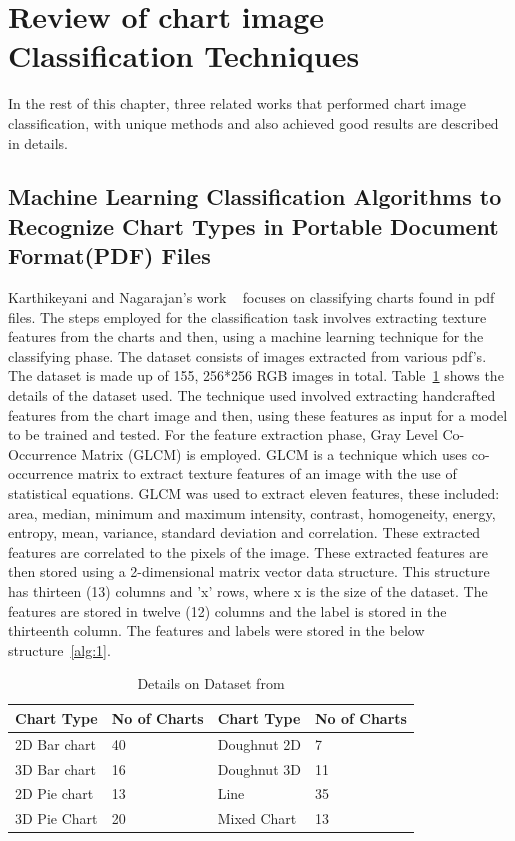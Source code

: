 \documentclass[12pt, a4paper,oneside]{report}
\begin{document}
\section{Review of chart image Classification Techniques}
In the rest of this chapter, three related works that performed chart image classification, with unique methods and also achieved good results are described in details.  

\subsection{Machine Learning Classification Algorithms to Recognize Chart Types in Portable Document Format(PDF) Files}
Karthikeyani and Nagarajan's work ~\cite{karthikeyani2012machine} focuses on classifying charts found in pdf files. The steps employed for the classification task involves extracting texture features from the charts and then, using a machine learning technique for the classifying phase. The dataset consists of images extracted from various pdf's. The dataset is made up of 155, 256*256 RGB images in total. Table~\ref{table:pdf} shows the details of the dataset used.
The technique used involved extracting handcrafted features from the chart image and then, using these features as input for a model to be trained and tested.
For the feature extraction phase, Gray Level Co-Occurrence Matrix (GLCM) is employed. GLCM is a technique which uses co-occurrence matrix to extract texture features of an image with the use of statistical equations. GLCM was used to extract eleven features, these included: area, median, minimum and maximum intensity, contrast, homogeneity, energy, entropy, mean, variance, standard deviation and correlation. These extracted features are correlated to the pixels of the image. These extracted features are then stored using a 2-dimensional matrix vector data structure. This structure has thirteen (13) columns and 'x' rows, where x is the size of the dataset. The features are stored in twelve (12) columns and the label is stored in the thirteenth column. The features and labels were stored in the below structure~\ref{alg:1}.

\begin{table}[h]
	\centering {} \small
	\begin{tabular}{|p{3cm}|p{3cm}|p{3cm}|p{3cm}|}
		\hline
		Chart Type & No of Charts & Chart
		Type & No of Charts  \\ \hline
		2D Bar chart & 40 & Doughnut 2D & 7 \\ \hline
		3D Bar chart & 16 & Doughnut 3D & 11\\ \hline
		2D Pie chart & 13 & Line & 35 \\ \hline
		3D Pie Chart & 20 & Mixed Chart& 13 \\ \hline
	\end{tabular}
	\caption {Details on Dataset from \cite{karthikeyani2012machine} }	
	\label{table:pdf}
\end{table}
\end{document}
